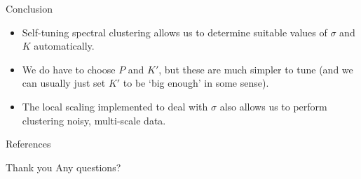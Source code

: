 \documentclass[aspectratio=169]{beamer}
\begin{document}
\begin{frame}{Conclusion}
    \begin{itemize}
      \item Self-tuning spectral clustering allows us to determine suitable values of $\sigma$ and $K$ automatically.
      \item We do have to choose $P$ and $K'$, but these are much simpler to tune (and we can usually just set $K'$ to be `big enough' in some sense).
      \item The local scaling implemented to deal with $\sigma$ also allows us to perform clustering noisy, multi-scale data.
    \end{itemize}
\end{frame}

\begin{frame}{References}
        
\end{frame}

\begin{frame}{Thank you}
\centering
    Any questions?
\end{frame}

\end{document}
